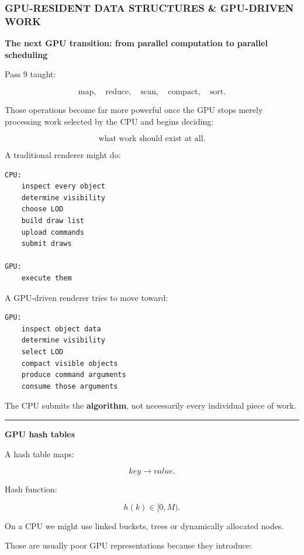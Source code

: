 \subsubsection{GPU-RESIDENT DATA STRUCTURES \& GPU-DRIVEN WORK}\label{gpu-resident-data-structures-gpu-driven-work}

\textbf{The next GPU transition: from parallel computation to parallel scheduling}

Pass 9 taught:

\[
\text{map},
\quad
\text{reduce},
\quad
\text{scan},
\quad
\text{compact},
\quad
\text{sort}.
\]

Those operations become far more powerful once the GPU stops merely processing work selected by the CPU and begins deciding:

\[
\boxed{
\text{what work should exist at all}.
}
\]

A traditional renderer might do:

\protect{}\label{p10-cpu-driven}%
\begin{verbatim}
CPU:
    inspect every object
    determine visibility
    choose LOD
    build draw list
    upload commands
    submit draws

GPU:
    execute them
\end{verbatim}

A GPU-driven renderer tries to move toward:

\protect{}\label{p10-gpu-driven}%
\begin{verbatim}
GPU:
    inspect object data
    determine visibility
    select LOD
    compact visible objects
    produce command arguments
    consume those arguments
\end{verbatim}

The CPU submits the \textbf{algorithm}, not necessarily every individual piece of work.

\begin{center}\rule{0.5\linewidth}{0.5pt}\end{center}

\textbf{GPU hash tables}

A hash table maps:

\[
key\rightarrow value.
\]

Hash function:

\[
h(k)\in[0,M).
\]

On a CPU we might use linked buckets, trees or dynamically allocated nodes.

Those are usually poor GPU representations because they introduce:

